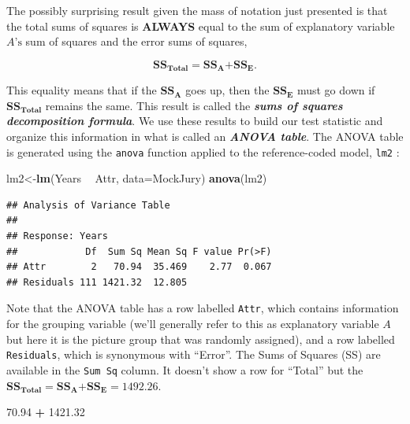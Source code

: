 \documentclass[]{book}
\newenvironment{Shaded}{\begin{snugshade}}{\end{snugshade}}
\newcommand{\KeywordTok}[1]{\textcolor[rgb]{0.13,0.29,0.53}{\textbf{#1}}}
\newcommand{\DataTypeTok}[1]{\textcolor[rgb]{0.13,0.29,0.53}{#1}}
\newcommand{\FloatTok}[1]{\textcolor[rgb]{0.00,0.00,0.81}{#1}}
\newcommand{\StringTok}[1]{\textcolor[rgb]{0.31,0.60,0.02}{#1}}
\newcommand{\OperatorTok}[1]{\textcolor[rgb]{0.81,0.36,0.00}{\textbf{#1}}}
\newcommand{\NormalTok}[1]{#1}
\theoremstyle{definition}
\theoremstyle{definition}
\theoremstyle{remark}
\begin{document}
The possibly surprising result given the mass of notation just presented
is that the total sums of squares is \textbf{ALWAYS} equal to the sum of
explanatory variable \(A\text{'s}\) sum of squares and the error sums of
squares,

\[\textbf{SS}_{\textbf{Total}} \mathbf{=} \textbf{SS}_\textbf{A} \mathbf{+} \textbf{SS}_\textbf{E}.\]

This equality means that if the \(\textbf{SS}_\textbf{A}\) goes up, then
the \(\textbf{SS}_\textbf{E}\) must go down if
\(\textbf{SS}_{\textbf{Total}}\) remains the same. This result is called
the \textbf{\emph{sums of squares decomposition formula}}. We use these
results to build our test statistic and organize this information in
what is called an \textbf{\emph{ANOVA table}}. The ANOVA table is
generated using the \texttt{anova} function applied to the
reference-coded model, \texttt{lm2} :

\begin{Shaded}
\begin{Highlighting}[]
\NormalTok{lm2<-}\KeywordTok{lm}\NormalTok{(Years }\OperatorTok{~}\StringTok{ }\NormalTok{Attr, }\DataTypeTok{data=}\NormalTok{MockJury)}
\KeywordTok{anova}\NormalTok{(lm2)}
\end{Highlighting}
\end{Shaded}

\begin{verbatim}
## Analysis of Variance Table
## 
## Response: Years
##            Df  Sum Sq Mean Sq F value Pr(>F)
## Attr        2   70.94  35.469    2.77  0.067
## Residuals 111 1421.32  12.805
\end{verbatim}

Note that the ANOVA table has a row labelled \texttt{Attr}, which
contains information for the grouping variable (we'll generally refer to
this as explanatory variable \(A\) but here it is the picture group that
was randomly assigned), and a row labelled \texttt{Residuals}, which is
synonymous with ``Error''. The Sums of Squares (SS) are available in the
\texttt{Sum\ Sq} column. It doesn't show a row for ``Total'' but the
\(\textbf{SS}_{\textbf{Total}} \mathbf{=} \textbf{SS}_\textbf{A} \mathbf{+} \textbf{SS}_\textbf{E} = 1492.26\).

\begin{Shaded}
\begin{Highlighting}[]
\FloatTok{70.94} \OperatorTok{+}\StringTok{ }\FloatTok{1421.32}
\end{Highlighting}
\end{Shaded}
\end{document}
